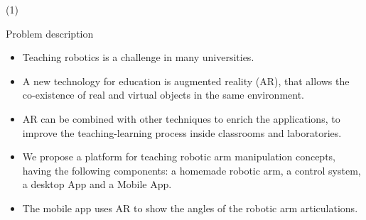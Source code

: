 



\begin{frame}{ \footnotemark (1)}
\begin{block}{Problem description} 
 
		\begin{itemize}
		\item Teaching robotics is a challenge in many universities.   
		\item A new technology for education is augmented reality (AR), that allows the co-existence of real and virtual objects in the same environment.  
		\item AR can be combined with other techniques to enrich the applications, to
improve the teaching-learning process inside classrooms and laboratories.  
\item We propose a platform for teaching robotic arm manipulation concepts, having the following components: a homemade robotic arm, a control system, a desktop App and a Mobile App.   
\item The mobile app uses AR to show the angles of the robotic arm articulations.  
		\end{itemize}
\end{block} 
\setcounter{footnote}{0}    
\end{frame}

